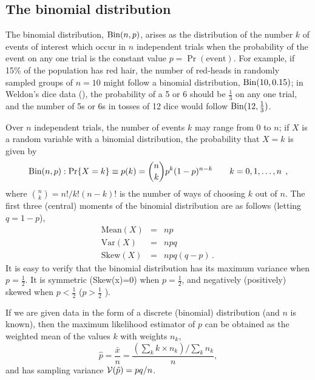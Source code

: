 \documentclass[10pt,krantz2]{krantz}\usepackage[]{graphicx}\usepackage[]{color}
\begin{document}



\subsection{The binomial distribution}\label{sec:binomial}
The binomial distribution, $\Bin(n, p)$,
arises as the distribution of the
number $k$ of events of interest which occur in $n$ independent trials
when the probability of the event on any one trial is the constant
value $p = \Pr ( \textrm{event} )$.
For example, if 15\% of the population has red hair,
the number of red-heads in randomly sampled groups of $n=10$
might follow a binomial distribution, $\Bin(10, 0.15)$;
in Weldon's dice data (), the probability of
a 5 or 6 should be $\frac13$ on any one trial, and
the number of 5s or 6s in tosses of 12 dice would follow
$\Bin(12, \frac13)$.

Over $n$ independent trials, the number of events  $k$
may range from 0 to $n$; if $X$ is a random variable
with a binomial distribution, the probability that $X = k$ is given
by
\begin{equation}\label{eq:binom}
\Bin(n,p): \Pr \{ X = k \} \equiv p ( k )  =
{n \choose k} p^k (1-p)^{n-k}
  \quad\quad k = 0, 1, \dots, n
  \comma
\end{equation}
where ${n \choose k} = n! / k! (n - k)!$ is the number of ways
of choosing $k$ out of $n$.
The first three (central) moments of the binomial distribution are
as follows
(letting $q = 1 - p$),
\begin{eqnarray*}
\textrm{Mean}(X) & = & n p  \\
\textrm{Var}(X) &  = & n p q \\
\textrm{Skew}(X) & = & n p q (q - p)
\period
\end{eqnarray*}
It is easy to verify that
the binomial distribution has its maximum variance when $p = \frac12$.
It is symmetric (Skew(x)=0) when $p = \frac12$, and negatively (positively)
skewed when $p < \frac12$ ($p > \frac12$ ).

If we are given data in the form of a discrete (binomial) distribution
(and $n$ is known),
then the maximum likelihood estimator of $p$ can be obtained
as the weighted mean of the values $k$ with weights $n_k$,
\begin{equation*}%
\hat{p} = \frac{\bar{x}}{n} =
  \frac{(\sum_{k} k \times n_k ) / \sum_k n_k}{n}
  \comma
\end{equation*}
and has sampling variance $\mathcal{V}(\hat{p}) = pq/n$.
\end{document}

